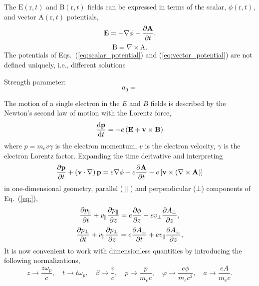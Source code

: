 \documentclass[10pt, a4paper, twoside, openright]{report}
\renewcommand{\vec}[1]{\boldsymbol{\mathrm{#1}}}
\newcommand{\rot}[1]{\nabla \times #1}
\newcommand{\grad}[1]{\nabla #1}
\renewcommand{\div}[1]{\nabla \cdot #1}
\begin{document}
The $ \vec{E} \left( \vec{r}, t \right) $ and $ \vec{B} \left( \vec{r}, t \right) $ fields can be expressed in terms of the scalar, $ \phi \left( \vec{r}, t \right) $, and vector $ \vec{A} \left( \vec{r}, t \right) $ potentials,
\begin{equation}\label{eq:scalar_potential}
	\vec{E} = -\grad{\phi} - \diffp{\vec{A}}{t},
\end{equation}
\begin{equation}\label{eq:vector_potential}
	\vec{B} = \rot{\vec{A}}.
\end{equation}
The potentials of Eqs.~(\ref{eq:scalar_potential}) and (\ref{eq:vector_potential}) are not defined uniquely, i.e., different solutions 

Strength parameter: 
\begin{equation}\label{key}
	a_0 = 
\end{equation}

The motion of a single electron in the $ E $ and $ B $ fields is described by the Newton's second law of motion with the Lorentz force,
\begin{equation}
	\diff{\vec{p}}{t} = -e \left( \vec{E} + \vec{v} \times \vec{B} \right)
\end{equation}
where $ p = m_e v \gamma $ is the electron momentum, $ v $ is the electron velocity, $ \gamma $ is the electron Lorentz factor. Expanding the time derivative and interpreting 
\begin{equation}
	\diffp{\vec{p}}{t} + \left(\vec{v} \cdot \grad \right) \vec{p} = e \grad{\phi} + e \diffp{\vec{A}}{t} - e \left[ \vec{v} \times \left( \rot{\vec{A}} \right) \right]
\end{equation}
in one-dimensional geometry, parallel ($ \parallel $) and perpendicular ($ \bot $) components of Eq.~(\ref{eq:}),
\begin{equation}
	\diffp{p_{\parallel}}{t} + v_{\parallel} \diffp{p_{\parallel}}{z} = e \diffp{\phi}{z} - e v_{\bot} \diffp{A_{\bot}}{z},
\end{equation}
\begin{equation}
	\diffp{p_{\bot}}{t} + v_{\parallel} \diffp{p_{\bot}}{z} = e \diffp{A_{\bot}}{t} + e v_{\parallel} \diffp{A_{\bot}}{z},
\end{equation}
It is now convenient to work with dimensionless quantities by introducing the following normalizations,
\begin{equation}\label{key}
	z \rightarrow \frac{z \omega_p}{c}, \quad t \rightarrow t \omega_p, \quad \beta \rightarrow \frac{v}{c}, \quad p \rightarrow \frac{p}{m_e c}, \quad \varphi \rightarrow \frac{e \phi}{m_e c^2}, \quad a \rightarrow \frac{e A}{m_e c}.
\end{equation}
\end{document}
